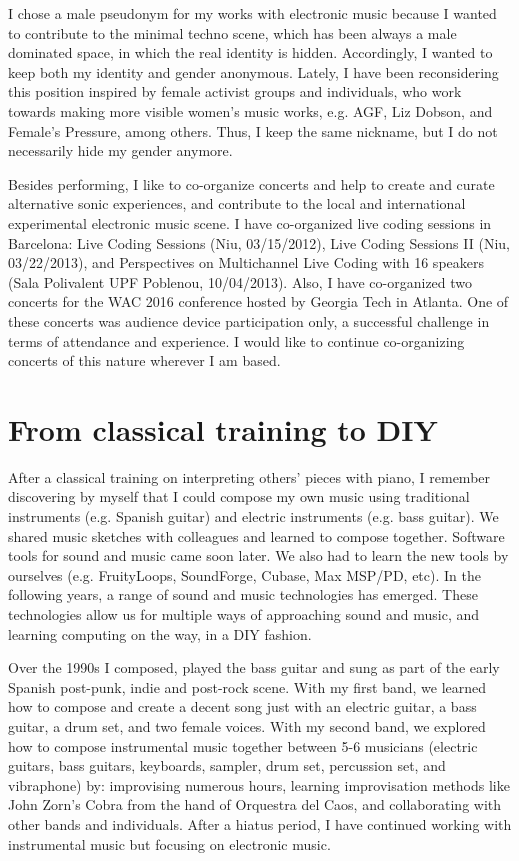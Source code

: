\documentclass[10pt, a4paper]{article}
\begin{document}
I chose a male pseudonym for my works with electronic music because I wanted to contribute to the minimal techno scene, which has been always a male dominated space, in which the real identity is hidden. Accordingly, I wanted to keep both my identity and gender anonymous. Lately, I have been reconsidering this position inspired by female activist groups and individuals, who work towards making more visible women's music works, e.g. AGF, Liz Dobson, and Female's Pressure, among others. Thus, I keep the same nickname, but I do not necessarily hide my gender anymore.

Besides performing, I like to co-organize concerts and help to create and curate alternative sonic experiences, and contribute to the local and international experimental electronic music scene. I have co-organized live coding sessions in Barcelona: Live Coding Sessions (Niu, 03/15/2012), Live Coding Sessions II (Niu, 03/22/2013), and Perspectives on Multichannel Live Coding with 16 speakers (Sala Polivalent UPF Poblenou, 10/04/2013). Also, I have co-organized two concerts for the WAC 2016 conference hosted by Georgia Tech in Atlanta. One of these concerts was audience device participation only, a successful challenge in terms of attendance and experience. I would like to continue co-organizing concerts of this nature wherever I am based.

\section*{From classical training to DIY}

After a classical training on interpreting others' pieces with piano, I remember discovering by myself that I could compose my own music using traditional instruments (e.g. Spanish guitar) and electric instruments (e.g. bass guitar). We shared music sketches with colleagues and learned to compose together. Software tools for sound and music came soon later. We also had to learn the new tools by ourselves (e.g. FruityLoops, SoundForge, Cubase, Max MSP/PD, etc). In the following years, a range of sound and music technologies has emerged. These technologies allow us for multiple ways of approaching sound and music, and learning computing on the way, in a DIY fashion.   

Over the 1990s I composed, played the bass guitar and sung as part of the early Spanish post-punk, indie and post-rock scene. With my first band, we learned how to compose and create a decent song just with an electric guitar, a bass guitar, a drum set, and two female voices. With my second band, we explored how to compose instrumental music together between 5-6 musicians (electric guitars, bass guitars, keyboards, sampler, drum set, percussion set, and vibraphone) by: improvising numerous hours, learning improvisation methods like John Zorn's Cobra from the hand of Orquestra del Caos, and collaborating with other bands and individuals. After a hiatus period, I have continued working with instrumental music but focusing on electronic music. 
\end{document}
